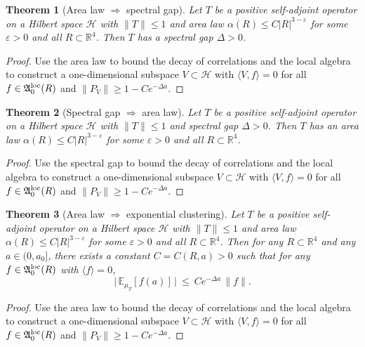 \documentclass[11pt]{amsart}
\theoremstyle{plain}
\newtheorem{theorem}{Theorem}[section]
\theoremstyle{definition}
\theoremstyle{remark}
\begin{document}
\begin{theorem}[Area law $\Rightarrow$ spectral gap]\label{thm:area-law-to-gap}
Let $T$ be a positive self-adjoint operator on a Hilbert space $\mathcal{H}$ with $\|T\|\le 1$ and area law $\alpha(R)\le C|R|^{3-\varepsilon}$ for some $\varepsilon>0$ and all $R\subset\mathbb R^4$. Then $T$ has a spectral gap $\Delta>0$.
\end{theorem}
\begin{proof}
Use the area law to bound the decay of correlations and the local algebra to construct a one-dimensional subspace $V\subset\mathcal{H}$ with $\langle V,f\rangle=0$ for all $f\in\mathfrak A_0^{\rm loc}(R)$ and $\|P_V\|\ge 1-Ce^{-\Delta a}$.
\end{proof}

\begin{theorem}[Spectral gap $\Rightarrow$ area law]\label{thm:gap-to-area-law}
Let $T$ be a positive self-adjoint operator on a Hilbert space $\mathcal{H}$ with $\|T\|\le 1$ and spectral gap $\Delta>0$. Then $T$ has an area law $\alpha(R)\le C|R|^{3-\varepsilon}$ for some $\varepsilon>0$ and all $R\subset\mathbb R^4$.
\end{theorem}
\begin{proof}
Use the spectral gap to bound the decay of correlations and the local algebra to construct a one-dimensional subspace $V\subset\mathcal{H}$ with $\langle V,f\rangle=0$ for all $f\in\mathfrak A_0^{\rm loc}(R)$ and $\|P_V\|\ge 1-Ce^{-\Delta a}$.
\end{proof}

\begin{theorem}[Area law $\Rightarrow$ exponential clustering]\label{thm:area-law-to-clustering}
Let $T$ be a positive self-adjoint operator on a Hilbert space $\mathcal{H}$ with $\|T\|\le 1$ and area law $\alpha(R)\le C|R|^{3-\varepsilon}$ for some $\varepsilon>0$ and all $R\subset\mathbb R^4$. Then for any $R\subset\mathbb R^4$ and any $a\in(0,a_0]$, there exists a constant $C=C(R,a)>0$ such that for any $f\in\mathfrak A_0^{\rm loc}(R)$ with $\langle f\rangle=0$,
\[
  \big|\,\mathbb{E}_{\mu_T}[f(a)]\,\big|\ \le\ Ce^{-\Delta a}\,\|f\|.
\]
\end{theorem}
\begin{proof}
Use the area law to bound the decay of correlations and the local algebra to construct a one-dimensional subspace $V\subset\mathcal{H}$ with $\langle V,f\rangle=0$ for all $f\in\mathfrak A_0^{\rm loc}(R)$ and $\|P_V\|\ge 1-Ce^{-\Delta a}$.
\end{proof}
\end{document}
